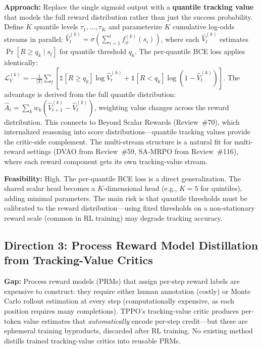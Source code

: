 \documentclass[11pt,a4paper]{article}
\begin{document}
\textbf{Approach:} Replace the single sigmoid output with a \textbf{quantile tracking value} that models the full reward distribution rather than just the success probability. Define $K$ quantile levels $\tau_1, \ldots, \tau_K$ and parameterize $K$ cumulative log-odds streams in parallel: $\hat{V}_t^{(k)} = \sigma(\sum_{i=1}^t f_\phi^{(k)}(s_i))$, where each $\hat{V}_t^{(k)}$ estimates $\Pr[R \geq q_k \mid s_t]$ for quantile threshold $q_k$. The per-quantile BCE loss applies identically: $\mathcal{L}_V^{(k)} = -\frac{1}{|T|}\sum_t [\mathbb{1}[R \geq q_k]\log \hat{V}_t^{(k)} + \mathbb{1}[R < q_k]\log(1 - \hat{V}_t^{(k)})]$. The advantage is derived from the full quantile distribution: $\hat{A}_t = \sum_k w_k(\hat{V}_{t+1}^{(k)} - \hat{V}_t^{(k)})$, weighting value changes across the reward distribution. This connects to Beyond Scalar Rewards (Review~\#70), which internalized reasoning into score distributions---quantile tracking values provide the critic-side complement. The multi-stream structure is a natural fit for multi-reward settings (DVAO from Review~\#59, SA-MRPO from Review~\#116), where each reward component gets its own tracking-value stream.

\textbf{Feasibility:} High. The per-quantile BCE loss is a direct generalization. The shared scalar head becomes a $K$-dimensional head (e.g., $K{=}5$ for quintiles), adding minimal parameters. The main risk is that quantile thresholds must be calibrated to the reward distribution---using fixed thresholds on a non-stationary reward scale (common in RL training) may degrade tracking accuracy.

\subsection{Direction 3: Process Reward Model Distillation from Tracking-Value Critics}
\textbf{Gap:} Process reward models (PRMs) that assign per-step reward labels are expensive to construct: they require either human annotation (costly) or Monte Carlo rollout estimation at every step (computationally expensive, as each position requires many completions). TPPO's tracking-value critic produces per-token value estimates that \emph{automatically} encode per-step credit---but these are ephemeral training byproducts, discarded after RL training. No existing method distills trained tracking-value critics into reusable PRMs.
\end{document}
